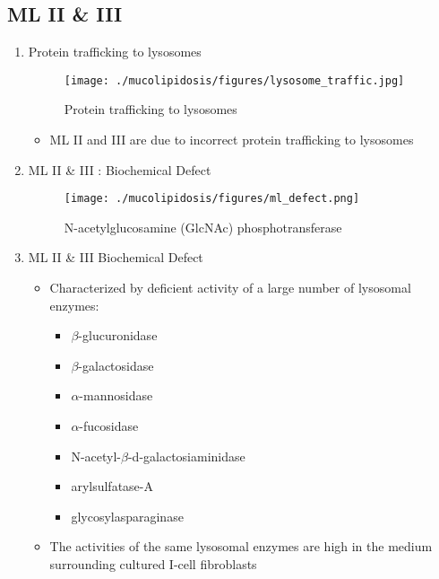 \documentclass{scrartcl}
\begin{document}
\subsection{ML II \& III}
\label{sec:org79c7f71}
\begin{enumerate}
\item Protein trafficking to lysosomes
\label{sec:org124cb77}

\begin{figure}[htbp]
\centering
\texttt{[image: ./mucolipidosis/figures/lysosome\_traffic.jpg]}
\caption[Protein trafficking to lysosomes]{\label{fig:orgcc20eb4}
Protein trafficking to lysosomes}
\end{figure}

\begin{itemize}
\item ML II and III are due to incorrect protein trafficking to lysosomes
\end{itemize}

\item ML II \& III : Biochemical Defect
\label{sec:orgecb6bff}

\begin{figure}[htbp]
\centering
\texttt{[image: ./mucolipidosis/figures/ml\_defect.png]}
\caption[N-acetylglucosamine (GlcNAc) phosphotransferase]{\label{fig:org5868ff1}
N-acetylglucosamine (GlcNAc) phosphotransferase}
\end{figure}

\item ML II \& III Biochemical Defect
\label{sec:org5b8b030}
\begin{itemize}
\item Characterized by deficient activity of a large number of lysosomal enzymes:
\begin{itemize}
\item \(\beta\)-glucuronidase
\item \(\beta\)-galactosidase
\item \(\alpha\)-mannosidase
\item \(\alpha\)-fucosidase
\item N-acetyl-\(\beta\)-d-galactosiaminidase
\item arylsulfatase-A
\item glycosylasparaginase
\end{itemize}
\item The activities of the same lysosomal enzymes are high in the medium
surrounding cultured I-cell fibroblasts
\end{itemize}



\end{enumerate}
\end{document}
